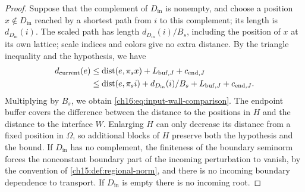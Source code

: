 \begin{proof}
Suppose that the complement of $D_{\mathrm{in}}$ is nonempty, and choose a position $x\notin D_{\mathrm{in}}$ reached by a shortest path from $i$ to this complement; its length is $d_{D_{\mathrm{in}}}(i)$. The scaled path has length $d_{D_{\mathrm{in}}}(i)/B_s$, including the position of $x$ at its own lattice; scale indices and colors give no extra distance. By the triangle inequality and the hypothesis, we have
\[
 \begin{split}
 d_{\mathrm{current}}(e)
 &\le\operatorname{dist}(e,\pi_sx)+L_{\mathrm{buf},J}+c_{\mathrm{end},J}\\
 &\le\operatorname{dist}(e,\pi_si)+d_{D_{\mathrm{in}}}(i)/B_s
                         +L_{\mathrm{buf},J}+c_{\mathrm{end},J}.
 \end{split}
\]
Multiplying by $B_s$, we obtain \eqref{ch16:eq:input-wall-comparison}. The endpoint buffer covers the difference between the distance to the positions in $H$ and the distance to the interface $W$. Enlarging $H$ can only decrease its distance from a fixed position in $\Omega$, so additional blocks of $H$ preserve both the hypothesis and the bound. If $D_{\mathrm{in}}$ has no complement, the finiteness of the boundary seminorm forces the nonconstant boundary part of the incoming perturbation to vanish, by the convention of \cref{ch15:def:regional-norm}, and there is no incoming boundary dependence to transport. If $D_{\mathrm{in}}$ is empty there is no incoming root.
\end{proof}

